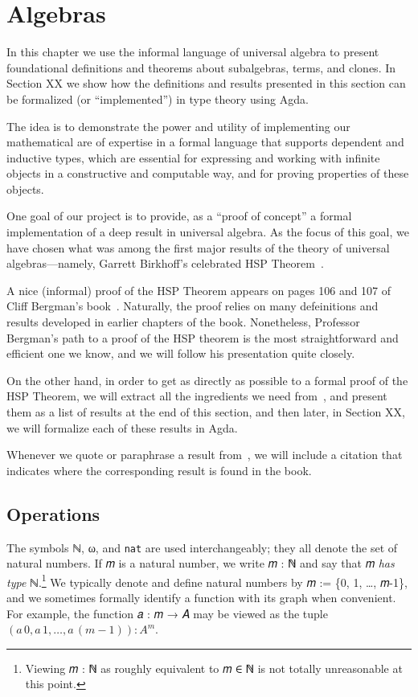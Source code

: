\documentclass[sigplan,screen]{acmart}
\begin{document}
\section{Algebras}\label{algebras}
In this chapter we use the informal language of universal algebra to present foundational definitions and theorems about subalgebras, terms, and clones. In Section XX we show how the definitions and results presented in this section can be formalized (or ``implemented'') in type theory using Agda.

The idea is to demonstrate the power and utility of implementing our mathematical are of expertise in a formal language that supports dependent and inductive types, which are essential for expressing and working with infinite objects in a constructive and computable way, and for proving properties of these objects.

One goal of our project is to provide, as a ``proof of concept'' a formal implementation of a deep result in universal algebra. As the focus of this goal, we have chosen what was among the first major results of the theory of universal algebras---namely, Garrett Birkhoff's celebrated HSP Theorem~\cite{Birkhoff:1935}.

A nice (informal) proof of the HSP Theorem appears on pages 106 and 107 of Cliff Bergman's book~\cite{Bergman:2012}. Naturally, the proof relies on many defeinitions and results developed in earlier chapters of the book. Nonetheless, Professor Bergman's path to a proof of the HSP theorem is the most straightforward and efficient one we know, and we will follow his presentation quite closely.

On the other hand, in order to get as directly as possible to a formal proof of the HSP Theorem, we will extract all the ingredients we need from~\cite{Bergman:2012}, and present them as a list of results at the end of this section, and then later, in Section XX, we will formalize each of these results in Agda.

Whenever we quote or paraphrase a result from~\cite{Bergman:2012}, we will include a citation that indicates where the corresponding result is found in the book.

\subsection{Operations}\label{operations}
The symbols ℕ, ω, and \texttt{nat} are used interchangeably; they all denote the set of natural numbers. If 𝑚 is a natural number, we write 𝑚 : ℕ and say that 𝑚 \emph{has type} ℕ.\footnote{Viewing 𝑚 : ℕ as roughly equivalent to 𝑚 ∈ ℕ is not totally unreasonable at this point.} We typically denote and define natural numbers by 𝑚 := \{0, 1, \ldots, 𝑚-1\}, and we sometimes formally identify a function with its graph when convenient. For example, the function 𝑎 : 𝑚 → 𝐴 may be viewed as the tuple \((𝑎\,0, 𝑎\,1, …, 𝑎\,(𝑚-1)) : 𝐴^m\).
\end{document}
